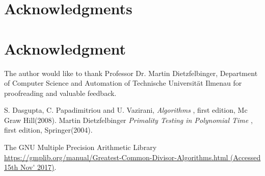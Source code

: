 \documentclass[conference,compsoc]{IEEEtran}
\begin{document}
\ifCLASSOPTIONcompsoc
  \section*{Acknowledgments}
\else
  \section*{Acknowledgment}
\fi
The author would like to thank Professor Dr. Martin Dietzfelbinger, Department of Computer Science and Automation of Technische Universität Ilmenau for proofreading
and valuable feedback.

\begin{thebibliography}{6}

S. Dasgupta, C. Papadimitriou and U. Vazirani, \textsl{Algorithms
},
first edition, Mc Graw Hill(2008).
Martin Dietzfelbinger \textsl{Primality Testing in Polynomial Time
},
first edition, Springer(2004).

The GNU Multiple Precision Arithmetic Library \url{https://gmplib.org/manual/Greatest-Common-Divisor-Algorithms.html (Accessed 15th Nov' 2017)}.

\end{thebibliography}

\end{document}

